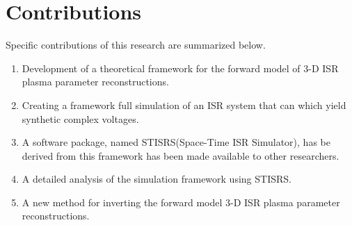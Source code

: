 \section{Contributions}
Specific contributions of this research are summarized below.

\begin{enumerate}
\item Development of a theoretical framework for the forward model of 3-D ISR plasma parameter reconstructions.
\item Creating a framework full simulation of an ISR system that can which yield synthetic complex voltages.
\item A software package, named STISRS(Space-Time ISR Simulator), has be derived from this framework has been made available to other researchers.
\item A detailed analysis of the simulation framework using STISRS.
\item A new method for inverting the forward model 3-D ISR plasma parameter reconstructions.
\end{enumerate}